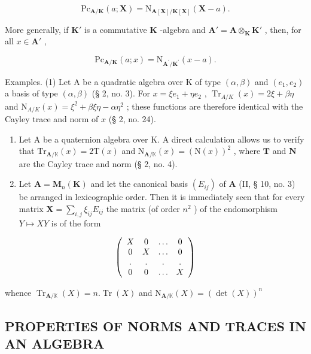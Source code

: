 \[
\mathrm{Pc} _ {\mathbf {A} / \mathbf {K}} (a; \mathbf {X}) = \mathrm{N} _ {\mathbf {A} [ \mathbf {X} ] / \mathbf {K} [ \mathbf {X} ]} (\mathbf {X} - a).\tag{22}
\]

More generally, if \(\mathbf{K}'\) is a commutative \(\mathbf{K}\) -algebra and \(\mathbf{A}' = \mathbf{A} \otimes_{\mathbf{K}} \mathbf{K}'\) , then, for all \(x \in \mathbf{A}'\) ,

\[
\mathrm{Pc} _ {\mathbf {A} / \mathbf {K}} (a; x) = \mathrm{N} _ {\mathbf {A} ^ {\prime} / \mathbf {K} ^ {\prime}} (x - a).
\]

Examples. (1) Let A be a quadratic algebra over K of type \((\alpha, \beta)\) and \((e_1, e_2)\) a basis of type \((\alpha, \beta)\) (§ 2, no. 3). For \(x = \xi e_1 + \eta e_2\) , \(\operatorname{Tr}_{A/K}(x) = 2\xi + \beta \eta\) and \(\mathrm{N}_{A/K}(x) = \xi^2 + \beta \xi \eta - \alpha \eta^2\) ; these functions are therefore identical with the Cayley trace and norm of \(x\) (§ 2, no. 24).

\begin{enumerate}
\def\labelenumi{(\arabic{enumi})}
\setcounter{enumi}{1}
\item
  Let A be a quaternion algebra over K. A direct calculation allows us to verify that \(\mathrm{Tr}_{\mathbf{A} / \mathbb{K}}(x) = 2\mathrm{T}(x)\) and \(\mathrm{N}_{\mathbf{A} / \mathbb{K}}(x) = (\mathrm{N}(x))^2\) , where \(\mathbf{T}\) and \(\mathbf{N}\) are the Cayley trace and norm (§ 2, no. 4).
\item
  Let \(\mathbf{A} = \mathbf{M}_n(\mathbf{K})\) and let the canonical basis \((E_{ij})\) of \(\mathbf{A}\) (II, § 10, no. 3) be arranged in lexicographic order. Then it is immediately seen that for every matrix \(\mathbf{X} = \sum_{i,j} \xi_{ij} E_{ij}\) the matrix (of order \(n^2\) ) of the endomorphism \(Y \mapsto XY\) is of the form
\end{enumerate}

\[
\left( \begin{array}{c c c c} X & 0 & \ldots & 0 \\ 0 & X & \ldots & 0 \\ . & . & . & . \\ 0 & 0 & \ldots & X \end{array} \right)
\]

whence \(\operatorname{Tr}_{\mathbf{A} / \mathbb{K}}(X) = n.\operatorname{Tr}(X)\) and \(\mathrm{N}_{\mathbf{A} / \mathbb{K}}(X) = (\det (X))^n\)

\subsection{PROPERTIES OF NORMS AND TRACES IN AN ALGEBRA}

